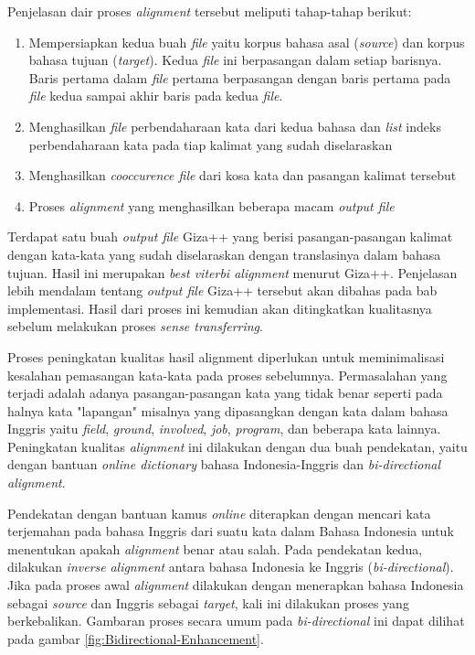 Penjelasan dair proses \textit{alignment} tersebut meliputi tahap-tahap berikut:
\begin{enumerate}
	\item Mempersiapkan kedua buah \textit{file} yaitu korpus bahasa asal (\textit{source}) dan korpus bahasa tujuan (\textit{target}). Kedua \textit{file} ini berpasangan dalam setiap barisnya. Baris pertama dalam \textit{file} pertama berpasangan dengan baris pertama pada \textit{file} kedua sampai akhir baris pada kedua \textit{file}.
	\item Menghasilkan \textit{file} perbendaharaan kata dari kedua bahasa dan \textit{list} indeks perbendaharaan kata pada tiap kalimat yang sudah diselaraskan
	\item Menghasilkan \textit{cooccurence file} dari kosa kata dan pasangan kalimat tersebut
	\item Proses \textit{alignment} yang menghasilkan beberapa macam \textit{output file} 
\end{enumerate}

Terdapat satu buah \textit{output file} Giza++ yang berisi pasangan-pasangan kalimat dengan kata-kata yang sudah diselaraskan dengan translasinya dalam bahasa tujuan. Hasil ini merupakan \textit{best viterbi alignment} menurut Giza++. Penjelasan lebih mendalam tentang \textit{output file} Giza++ tersebut akan dibahas pada bab implementasi. Hasil dari proses ini kemudian akan ditingkatkan kualitasnya sebelum melakukan proses \textit{sense transferring}.

Proses peningkatan kualitas hasil alignment diperlukan untuk meminimalisasi kesalahan pemasangan kata-kata pada proses sebelumnya. Permasalahan  yang terjadi adalah adanya pasangan-pasangan kata yang tidak benar seperti pada halnya kata "lapangan" misalnya yang  dipasangkan dengan kata dalam bahasa Inggris yaitu \textit{field}, \textit{ground}, \textit{involved}, \textit{job}, \textit{program}, dan beberapa kata lainnya. Peningkatan kualitas \textit{alignment} ini dilakukan dengan dua buah pendekatan, yaitu dengan bantuan \textit{online dictionary} bahasa Indonesia-Inggris dan \textit{bi-directional alignment}. 

Pendekatan dengan bantuan kamus \textit{online} diterapkan dengan mencari kata terjemahan pada bahasa Inggris dari suatu kata dalam Bahasa Indonesia untuk menentukan apakah \textit{alignment} benar atau salah. Pada pendekatan kedua, dilakukan \textit{inverse} \textit{alignment} antara bahasa Indonesia ke Inggris (\textit{bi-directional}). Jika pada proses awal \textit{alignment} dilakukan dengan menerapkan bahasa Indonesia sebagai \textit{source} dan Inggris sebagai \textit{target}, kali ini dilakukan proses yang berkebalikan. Gambaran proses secara umum pada \textit{bi-directional} ini dapat dilihat pada gambar \ref{fig:Bidirectional-Enhancement}.

